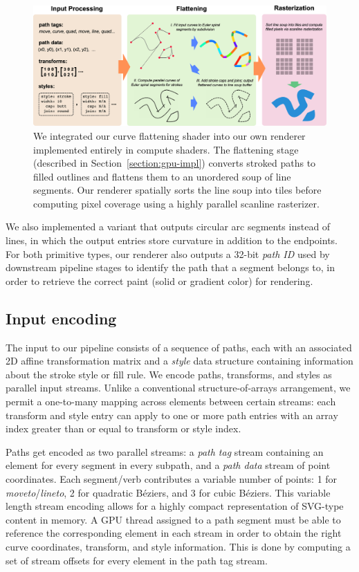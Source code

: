 \documentclass[sigconf, nonacm]{acmart}
\begin{document}
\begin{figure}
    \includegraphics[scale=0.275]{pipeline}
    \caption{We integrated our curve flattening shader into our own renderer implemented entirely in compute shaders. The flattening stage (described in Section~\ref{section:gpu-impl}) converts stroked paths to filled outlines and flattens them to an unordered soup of line segments. Our renderer spatially sorts the line soup into tiles before computing pixel coverage using a highly parallel scanline rasterizer.}
    \label{fig:pipeline}
\end{figure}


We also implemented a variant that outputs circular arc segments instead of lines, in which the output entries store curvature in addition to the endpoints. For both primitive types, our renderer also outputs a 32-bit \emph{path ID} used by downstream pipeline stages to identify the path that a segment belongs to, in order to retrieve the correct paint (solid or gradient color) for rendering.


\subsection{Input encoding}

The input to our pipeline consists of a sequence of paths, each with an associated 2D affine transformation matrix and a \emph{style} data structure containing information about the stroke style or fill rule. We encode paths, transforms, and styles as parallel input streams. Unlike a conventional structure-of-arrays arrangement, we permit a one-to-many mapping across elements between certain streams: each transform and style entry can apply to one or more path entries with an array index greater than or equal to transform or style index.

Paths get encoded as two parallel streams: a \emph{path tag} stream containing an element for every segment in every subpath, and a \emph{path data} stream of point coordinates. Each segment/verb contributes a variable number of points: 1 for \emph{moveto}/\emph{lineto}, 2 for quadratic Béziers, and 3 for cubic Béziers. This variable length stream encoding allows for a highly compact representation of SVG-type content in memory. A GPU thread assigned to a path segment must be able to reference the corresponding element in each stream in order to obtain the right curve coordinates, transform, and style information. This is done by computing a set of stream offsets for every element in the path tag stream.
\end{document}
